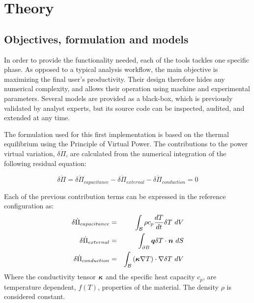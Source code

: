 \chapter{Theory}

\section{Objectives, formulation and models}
In order to provide the functionality needed, each of the tools tackles one specific phase. As opposed to a typical analysis workflow, the main objective is maximizing the final user's productivity. Their design therefore hides any numerical complexity, and allows their operation using machine and experimental parameters. Several models are provided as a black-box, which is previously validated by analyst experts, but its source code can be inspected, audited, and extended at any time.

The formulation used for this first implementation is based on the thermal equilibrium using the Principle of Virtual Power. The contributions to the power virtual variation, $\delta \dot \Pi$, are calculated from the numerical integration of the following residual equation:

\begin{equation}\label{eq:var_trabajo}
\delta \dot \Pi = \delta \dot \Pi_{capacitance} - \delta \dot \Pi_{external} - \delta \dot \Pi_{conduction} = 0
\end{equation}

Each of the previous contribution terms can be expressed in the reference configuration \cite{Iglesias2015} as:
\begin{eqnarray}
\label{eq:var_potential_th_internal}
\delta \dot \Pi_{capacitance} & = & \int_{\mathcal B} \rho c_p \frac{dT}{dt} \delta T \ dV
\\
\label{eq:var_potential_th_int}
\delta \dot \Pi_{external} & = & \int_{\mathcal \partial B} \boldsymbol q \delta T \cdot \boldsymbol n \ dS
\\
\label{eq:var_potential_th_conduction}
\delta \dot \Pi_{conduction} & = & \int_{\mathcal B} \left( \boldsymbol \kappa \nabla T \right) \cdot \nabla \delta T \ dV
\end{eqnarray}
Where the conductivity tensor $\boldsymbol \kappa$ and the specific heat capacity $c_p$, are temperature dependent, $f(T)$, properties of the material. The density $\rho$ is considered constant.


